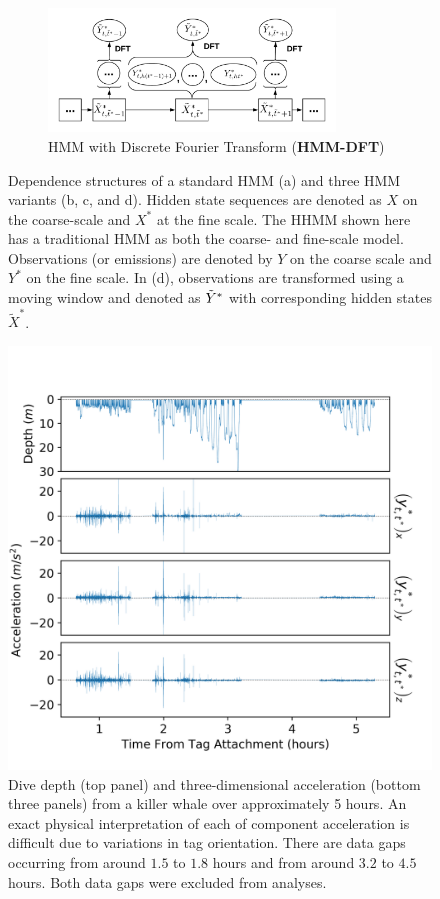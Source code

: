 \begin{figure}[ht]
\begin{subfigure}{\textwidth}
    \end{subfigure}
    \newline
    \begin{subfigure}{\textwidth}
      \centering
      \includegraphics[width=3in]{../Plots/HMM-DFT.png}  
      \caption{HMM with Discrete Fourier Transform (\textbf{HMM-DFT})}
      \label{fig:HMM-DFT}
    \end{subfigure}
    \caption{Dependence structures of a standard HMM (a) and three HMM variants (b, c, and d). Hidden state sequences are denoted as $X$ on the coarse-scale and $X^*$ at the fine scale. The HHMM shown here has a traditional HMM as both the coarse- and fine-scale model. Observations (or emissions) are denoted by $Y$ on the coarse scale and $Y^*$ on the fine scale. In (d), observations are transformed using a moving window and denoted as $\tilde{Y}^*$ with corresponding hidden states $\tilde X^*$.}
    \label{fig:models}
\end{figure}


\begin{figure}[ht]
	\centering
	\includegraphics[width=5.25in]{../Plots/raw_data.png}
	\caption{Dive depth (top panel) and three-dimensional acceleration (bottom three panels) from a killer whale over approximately 5 hours. An exact physical interpretation of each of component acceleration is difficult due to variations in tag orientation. There are data gaps occurring from around $1.5$ to $1.8$ hours and from around $3.2$ to $4.5$ hours. Both data gaps were excluded from analyses.}
	\label{fig:data}
\end{figure}

